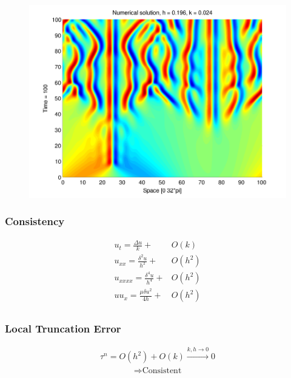 \documentclass[screen]{beamer}
\begin{document}
\begin{frame}

\begin{figure}[htb]
\includegraphics[width=1\textwidth]{KS_plot_contour.pdf}
\end{figure}

\end{frame}


\begin{frame}
\frametitle{Consistency}
\begin{align*}
u_t= \frac{\Delta u}{k} + &O(k) \\
u_{xx} = \frac{\delta^2 u}{h^2} + &O(h^2) \\
u_{xxxx} = \frac{\delta^4 u}{h^4} + &O(h^2) \\
uu_{x} = \frac{\mu \delta u^2}{4h} + &O(h^2) \\
\end{align*}

\end{frame}

\begin{frame}

\frametitle{Local Truncation Error}

\begin{align*}
\tau ^n = O(h^2) + O(k) \xrightarrow{k,h \to 0} 0
\end{align*}
\begin{align*}
\Rightarrow \textrm{Consistent}
\end{align*}

\end{frame}
\end{document}
